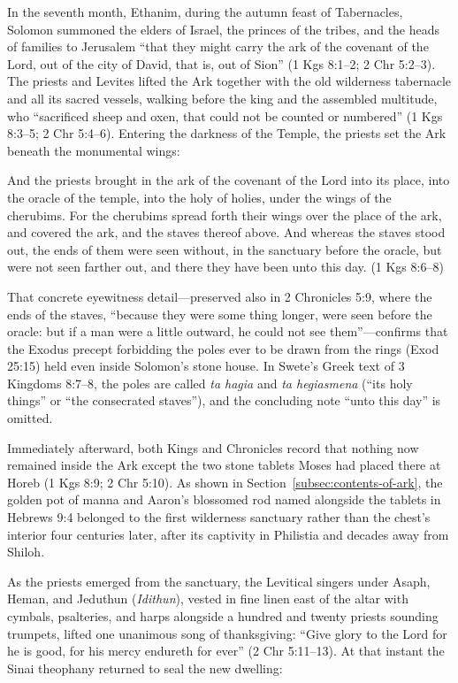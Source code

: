 In the seventh month, Ethanim, during the autumn feast of Tabernacles, Solomon summoned the elders of Israel, the princes of the tribes, and the heads of families to Jerusalem ``that they might carry the ark of the covenant of the Lord, out of the city of David, that is, out of Sion'' (1 Kgs 8:1--2; 2 Chr 5:2--3). The priests and Levites lifted the Ark together with the old wilderness tabernacle and all its sacred vessels, walking before the king and the assembled multitude, who ``sacrificed sheep and oxen, that could not be counted or numbered'' (1 Kgs 8:3--5; 2 Chr 5:4--6). Entering the darkness of the Temple, the priests set the Ark beneath the monumental wings:

\begin{scriptureblock}
And the priests brought in the ark of the covenant of the Lord into its place, into the oracle of the temple, into the holy of holies, under the wings of the cherubims. For the cherubims spread forth their wings over the place of the ark, and covered the ark, and the staves thereof above. And whereas the staves stood out, the ends of them were seen without, in the sanctuary before the oracle, but were not seen farther out, and there they have been unto this day. \textnormal{(1 Kgs 8:6--8)}
\end{scriptureblock}

That concrete eyewitness detail---preserved also in 2 Chronicles 5:9, where the ends of the staves, ``because they were some thing longer, were seen before the oracle: but if a man were a little outward, he could not see them''---confirms that the Exodus precept forbidding the poles ever to be drawn from the rings (Exod 25:15) held even inside Solomon's stone house. In Swete's Greek text of 3 Kingdoms 8:7--8, the poles are called \textit{ta hagia} and \textit{ta hegiasmena} (``its holy things'' or ``the consecrated staves''), and the concluding note ``unto this day'' is omitted.

Immediately afterward, both Kings and Chronicles record that nothing now remained inside the Ark except the two stone tablets Moses had placed there at Horeb (1 Kgs 8:9; 2 Chr 5:10). As shown in Section~\ref{subsec:contents-of-ark}, the golden pot of manna and Aaron's blossomed rod named alongside the tablets in Hebrews 9:4 belonged to the first wilderness sanctuary rather than the chest's interior four centuries later, after its captivity in Philistia and decades away from Shiloh.

As the priests emerged from the sanctuary, the Levitical singers under Asaph, Heman, and Jeduthun (\textit{Idithun}), vested in fine linen east of the altar with cymbals, psalteries, and harps alongside a hundred and twenty priests sounding trumpets, lifted one unanimous song of thanksgiving: ``Give glory to the Lord for he is good, for his mercy endureth for ever'' (2 Chr 5:11--13). At that instant the Sinai theophany returned to seal the new dwelling:


